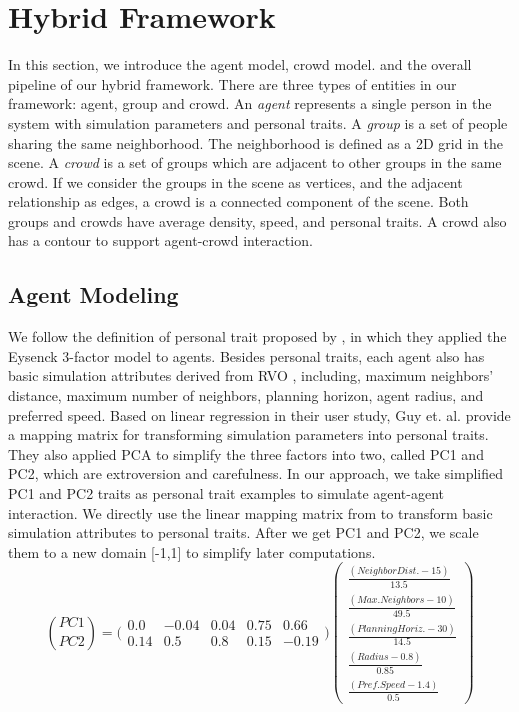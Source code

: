 \documentclass[conference]{acmsiggraph}
\begin{document}
\section{Hybrid Framework}
\label{section:3}
In this section, we introduce the agent model, crowd model. and the overall pipeline of our hybrid framework. There are three types of entities in our framework: agent, group and crowd. An \emph{agent} represents a single person in the system with simulation parameters and personal traits. A \emph{group} is a set of people sharing the same neighborhood. The neighborhood is defined as a 2D grid in the scene. A \emph{crowd} is a set of groups which are adjacent to other groups in the same crowd. If we consider the groups in the scene as vertices, and the adjacent relationship as edges, a crowd is a connected component of the scene. Both groups and crowds have average density, speed, and personal traits. A crowd also has a contour to support agent-crowd interaction.
\subsection{Agent Modeling}
\label{section:3.1}
We follow the definition of personal trait proposed by \cite{Guy:2010}, in which they applied the Eysenck 3-factor model \cite{Eysenck:1985} to agents. Besides personal traits, each agent also has basic simulation attributes derived from RVO  \cite{VDBerg:2009}, including, maximum neighbors’ distance, maximum number of neighbors, planning horizon, agent radius, and preferred speed. Based on linear regression in their user study, Guy et. al. provide a mapping matrix for transforming simulation parameters into personal traits. They also applied PCA to simplify the three factors into two, called PC1 and PC2, which are extroversion and carefulness. In our approach, we take simplified PC1 and PC2 traits as personal trait examples to simulate agent-agent interaction. We directly use the linear mapping matrix from \cite{Guy:2010} to transform basic simulation attributes to personal traits. After we get PC1 and PC2, we scale them to a new domain  [-1,1] to simplify later computations.
\begin{equation}
\label{eq:1}
	\binom{PC1}{PC2}= \bigl(
	\begin{smallmatrix}
	0.0 & -0.04 & 0.04 &0.75 & 0.66\\ 
	0.14 & 0.5 & 0.8 & 0.15 & -0.19
	\end{smallmatrix}\bigr)
	\begin{pmatrix}
	\frac{(Neighbor Dist.-15)}{13.5}\\ 
	\frac{(Max.Neighbors-10)}{49.5}\\ 
	\frac{(Planning Horiz.-30)}{14.5}\\ 
	\frac{(Radius-0.8)}{0.85}\\ 
	\frac{(Pref. Speed-1.4)}{0.5}
	\end{pmatrix}
\end{equation}
\end{document}
